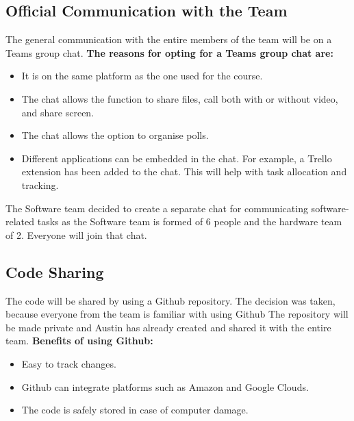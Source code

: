 \documentclass{article}
\begin{document}
\subsection{Official Communication with the Team}
The general communication with the entire members of the team will be on a Teams group chat. 
\newline
\textbf{The reasons for opting for a Teams group chat are: }
\begin{itemize}
\item It is on the same platform as the one used for the course. 
\item The chat allows the function to share files, call both with or without video, and share screen. 
\item The chat allows the option to organise polls. 
\item Different applications can be embedded in the chat. For example, a Trello extension has been added to the chat. This will help with task allocation and tracking. 
\end{itemize}
The Software team decided to create a separate chat for communicating software-related tasks as the Software team is formed of 6 people and the hardware team of 2. Everyone will join that chat. 

\subsection{Code Sharing}
The code will be shared by using a Github repository. The decision was taken, because everyone from the team is familiar with using Github The repository will be made private and Austin has already created and shared it with the entire team.  
\newline
\textbf{Benefits of using Github: }
\begin{itemize}
\item Easy to track changes. 
\item Github can integrate platforms such as Amazon and Google Clouds. 
\item The code is safely stored in case of computer damage. 
\end{itemize}
\end{document}
